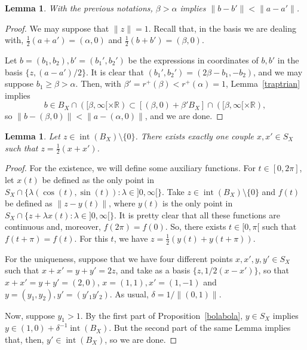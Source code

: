\documentclass[12pt]{amsproc}
\newtheorem{lemma}[theorem]{Lemma}
\theoremstyle{remark}
\def\equi{=}
\def\interior{\operatorname{int}}
\def\R{\mathbb R}
\begin{document}
\begin{lemma}\label{normamedios}
With the previous notations, $\beta>\alpha$ implies $\|b-b'\|< \|a-a'\|$. 
\end{lemma}

\begin{proof}
We may suppose that $\|z\|=1$. Recall that, in the basis we are dealing with, 
$\frac 12(a+a')\equi(\alpha,0)$ and $\frac 12(b+b')\equi(\beta,0)$. 

Let $b\equi(b_1,b_2), b'\equi(b_1',b_2')$ be the expressions in coordinates of $b, b'$ 
in the basis $\{z, (a-a')/2\}$. It is clear that $(b_1',b_2')\equi(2\beta-b_1, -b_2)$, and 
we may suppose $b_1\geq \beta>\alpha$. Then, with $\beta'=r^+(\beta)<r^+(\alpha)=1$, Lemma~\ref{traptrian} implies 
$$b\in B_X\cap([\beta,\infty[\times\R)\subset [(\beta,0)+\beta'B_X]\cap([\beta,\infty[\times\R),$$
so $\left\|b-(\beta,0)\right\|<\|a-(\alpha,0)\|$, and we are done. 
\end{proof}

\begin{lemma}\label{proyeccion}
Let $z\in \interior(B_X)\setminus\{0\}$. There exists exactly one couple $x, x'\in S_X$ such that 
$z=\frac 12(x+x')$. 
\end{lemma}

\begin{proof}
For the existence, we will define some auxiliary functions. For $t\in[0,2\pi]$, 
let $x(t)$ be defined as the only point in $S_X\cap\{\lambda(\cos(t),\sin(t)):\lambda\in]0,\infty[\}$. 
Take $z\in \interior(B_X)\setminus\{0\}$ and $f(t)$ be defined as $\|z-y(t)\|$, where 
$y(t)$ is the only point in $S_X\cap\{z+\lambda x(t):\lambda\in]0,\infty[\}$. 
It is pretty clear that all these functions are continuous and, moreover, 
$f(2\pi)=f(0)$. So, there exists $t\in[0,\pi[$ such that $f(t+\pi)=f(t)$. 
For this $t$, we have $z=\frac 12(y(t)+y(t+\pi))$. 

For the uniqueness, suppose that we have four different points 
$x, x', y, y'\in S_X$ such that $x+x'=y+y'=2z$, and take as a basis 
$\{z,1/2(x-x')\}$, so that $x+x'=y+y'\equi(2,0)$, $x\equi(1,1), x'\equi(1, -1)$ and 
$y\equi(y_1,y_2), y'\equi(y'_1y'_2)$. As usual, $\delta=1/\|(0,1)\|.$

Now, suppose $y_1>1$. By the first part of Proposition~\ref{bolabola}, $y\in S_X$ 
implies $y\in(1,0)+\delta^{-1}\interior(B_X)$. But the second part of the same Lemma 
implies that, then, $y'\in\interior(B_X)$, so we are done. 
\end{proof}
\end{document}
